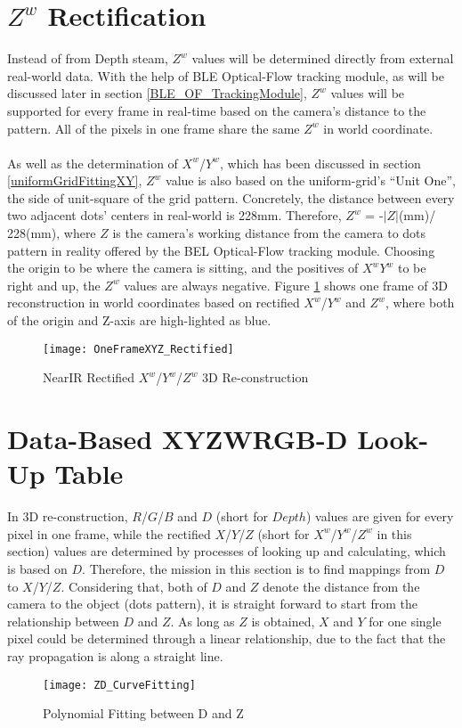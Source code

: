 \section{\(Z^{w}\) Rectification}
%
Instead of from Depth steam, \(Z^{w}\) values will be determined directly from external real-world data. With the help of BLE Optical-Flow tracking module, as will be discussed later in section \ref{BLE_OF_TrackingModule}, \(Z^{w}\) values will be supported for every frame in real-time based on the camera's distance to the pattern. All of the pixels in one frame share the same \(Z^{w}\) in world coordinate.%
\\\\%
As well as the determination of \(X^{w}\)/\(Y^{w}\), which has been discussed in section \ref{uniformGridFittingXY},  \(Z^{w}\) value is also based on the uniform-grid's \enquote{Unit One},  the side of unit-square of the grid pattern. Concretely, the distance between every two adjacent dots' centers in real-world is 228mm. Therefore, \(Z^{w}\) = -\(|Z|\)(mm)/ 228(mm), where \(Z\) is the camera's working distance from the camera to dots pattern in reality offered by the BEL Optical-Flow tracking module. Choosing the origin to be where the camera is sitting, and the positives of \(X^{w}\)\(Y^{w}\) to be right and up, the \(Z^{w}\) values are always negative. Figure \ref{OneFrameXYZ_Rectified} shows one frame of 3D reconstruction in world coordinates based on rectified \(X^{w}\)/\(Y^{w}\) and \(Z^{w}\), where both of the origin and Z-axis are high-lighted as blue.%
%
\begin{figure}[h]
\centering
\texttt{[image: OneFrameXYZ\_Rectified]}
\caption{NearIR Rectified \(X^{w}\)/\(Y^{w}\)/\(Z^{w}\) 3D Re-construction}
\label{OneFrameXYZ_Rectified}
\end{figure}%
%
\section{Data-Based XYZWRGB-D Look-Up Table}
In 3D re-construction, \(R\)/\(G\)/\(B\) and \(D\) (short for \(Depth\)) values are given for every pixel in one frame, while the rectified \(X\)/\(Y\)/\(Z\) (short for \(X^{w}\)/\(Y^{w}\)/\(Z^{w}\) in this section) values are determined by processes of looking up and calculating, which is based on \(D\). Therefore, the mission in this section is to find mappings from \(D\) to \(X\)/\(Y\)/\(Z\). Considering that, both of \(D\) and \(Z\) denote the distance from the camera to the object (dots pattern), it is straight forward to start from the relationship between \(D\) and \(Z\). As long as \(Z\) is obtained, \(X\) and \(Y\) for one single pixel could be determined through a linear relationship, due to the fact that the ray propagation is along a straight line.\\%
%
\begin{figure}[h]
\centering
\texttt{[image: ZD\_CurveFitting]}
\caption{Polynomial Fitting between D and Z}
\label{ZD_CurveFitting}
\end{figure}%
%
%
